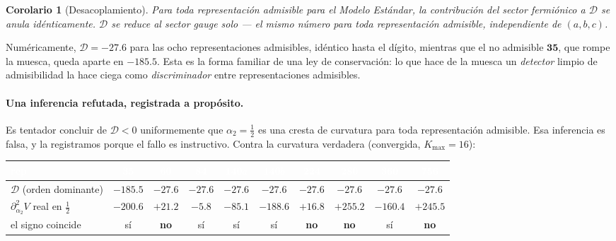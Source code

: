 \documentclass[11pt,a4paper]{article}
\newtheorem{corolario}{Corolario}
\begin{document}
\begin{corolario}[Desacoplamiento]\label{cor:decoupling}
Para toda representación admisible para el Modelo Estándar, la contribución del sector
fermiónico a $\mathcal D$ se anula idénticamente. $\mathcal D$ se reduce al sector gauge solo
--- el mismo número para toda representación admisible, independiente de $(a,b,c)$.
\end{corolario}

Numéricamente, $\mathcal D=-27.6$ para las ocho representaciones admisibles, idéntico hasta el
dígito, mientras que el no admisible $\mathbf{35}$, que rompe la muesca, queda aparte en
$-185.5$. Esta es la forma familiar de una ley de conservación: lo que hace de la muesca un
\emph{detector} limpio de admisibilidad la hace ciega como \emph{discriminador} entre
representaciones admisibles.

\paragraph{Una inferencia refutada, registrada a propósito.} Es tentador concluir de
$\mathcal D<0$ uniformemente que $\alpha_2=\tfrac12$ es una cresta de curvatura para toda
representación admisible. Esa inferencia es falsa, y la registramos porque el fallo es
instructivo. Contra la curvatura verdadera (convergida, $K_{\max}=16$):

\begin{center}\footnotesize
\begin{tabular}{lccccccccc}
\toprule
\rowcolor{hdrblue}
\textcolor{white}{rep} & \textcolor{white}{$\mathbf{35}$} & \textcolor{white}{$\mathbf{60}$} &
\textcolor{white}{$\mathbf{84}$} & \textcolor{white}{$\mathbf{140}a$} & \textcolor{white}{$\mathbf{140}b$} &
\textcolor{white}{$\mathbf{224}$} & \textcolor{white}{$\mathbf{280}$} & \textcolor{white}{$\mathbf{360}$} &
\textcolor{white}{$\mathbf{756}$}\\
\midrule
$\mathcal D$ (orden dominante) & $-185.5$ & $-27.6$ & $-27.6$ & $-27.6$ & $-27.6$ & $-27.6$ & $-27.6$ & $-27.6$ & $-27.6$\\
\rowcolor{softgrey}
$\partial^2_{\alpha_2}V$ real en $\tfrac12$ & $-200.6$ & $+21.2$ & $-5.8$ & $-85.1$ & $-188.6$ & $+16.8$ & $+255.2$ & $-160.4$ & $+245.5$\\
el signo coincide & sí & \textbf{no} & sí & sí & sí & \textbf{no} & \textbf{no} & sí & \textbf{no}\\
\bottomrule
\end{tabular}
\end{center}
\end{document}
